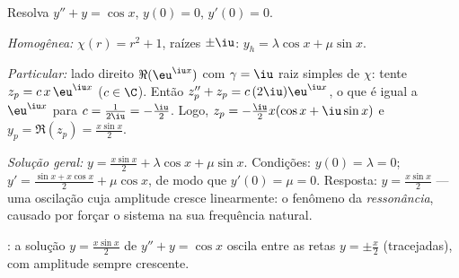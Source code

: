 \begin{example}\label{ex:b1:diffeq:oscillation}
Resolva $y'' + y = \cos x$, $y(0) = 0$, $y'(0) = 0$.

\emph{Homogênea:} $\chi(r) = r^2 + 1$, raízes $\pm\iu$: $y_h =
\lambda\cos x + \mu \sin x$.

\emph{Particular:} lado direito $\Re(\eu^{\iu x})$ com $\gamma =
\iu$ raiz simples de $\chi$: tente $z_p = c\, x\, \eu^{\iu x}$
($c \in \C$). Então $z_p'' + z_p = c\,(2\iu)\eu^{\iu x}$, o que é igual a
$\eu^{\iu x}$ para $c = \frac{1}{2\iu} = -\frac\iu2$. Logo, $z_p =
-\frac{\iu}{2} x (\cos x + \iu \sin x)$ e $y_p = \Re(z_p) =
\frac{x \sin x}{2}$.

\emph{Solução geral:} $y = \frac{x\sin x}{2} + \lambda\cos x +
\mu\sin x$. Condições: $y(0) = \lambda = 0$; $y' = \frac{\sin x +
x\cos x}{2} + \mu\cos x$, de modo que $y'(0) = \mu = 0$. Resposta: $y =
\frac{x\sin x}{2}$ --- uma oscilação cuja amplitude cresce linearmente:
o fenômeno da \emph{ressonância}, causado por forçar
o sistema na sua frequência natural.
\end{example}

\begin{omfigure}

{\small {}: a solução $y = \frac{x \sin x}{2}$ de $y'' + y =
\cos x$
oscila entre as retas $y = \pm\frac x2$ (tracejadas), com
amplitude sempre crescente.}
\end{omfigure}


